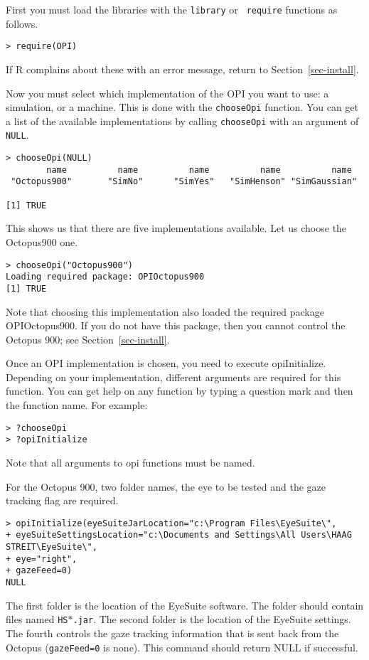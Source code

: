 \documentclass{article}
\begin{document}
First you must load the libraries with the {\tt library} or {\tt
require} functions as follows.

\begin{verbatim}
> require(OPI)
\end{verbatim}

If R complains about these with an error message, return to Section~\ref{sec-install}.

Now you must select which implementation of the OPI you want to
use: a simulation, or a machine. This is done with the {\tt chooseOpi}
function. You can get a list of the available implementations by
calling {\tt chooseOpi} with an argument of {\tt NULL}.

\begin{verbatim}
> chooseOpi(NULL)
        name          name          name          name          name 
 "Octopus900"       "SimNo"      "SimYes"   "SimHenson" "SimGaussian" 

[1] TRUE
\end{verbatim}

This shows us that there are five implementations available.
Let us choose the Octopus900 one.

\begin{verbatim}
> chooseOpi("Octopus900") 
Loading required package: OPIOctopus900 
[1] TRUE
\end{verbatim}

Note that choosing this implementation also loaded the required package
OPIOctopus900. If you do not have this package, then you cannot control the
Octopus 900; see Section~\ref{sec-install}.

Once an OPI implementation is chosen, you need to execute opiInitialize.
Depending on your implementation, different arguments are required for this
function. You can get help on any function by typing a question mark and
then the function name. For example:

\begin{verbatim}
> ?chooseOpi
> ?opiInitialize
\end{verbatim}

Note that all arguments to opi functions must be named.

For the Octopus 900, two folder names, the eye to be tested and the gaze tracking flag are required.
\begin{verbatim}
> opiInitialize(eyeSuiteJarLocation="c:\Program Files\EyeSuite\",
+ eyeSuiteSettingsLocation="c:\Documents and Settings\All Users\HAAG STREIT\EyeSuite\",
+ eye="right",
+ gazeFeed=0)
NULL
\end{verbatim}
The first folder is the location of the EyeSuite software. The folder should contain files
named {\tt HS$\ast$.jar}.
The second folder is the location of the EyeSuite settings.
The fourth controls the gaze tracking information that is sent back from the Octopus ({\tt gazeFeed=0} is none).
This command should return NULL if successful.
\end{document}
